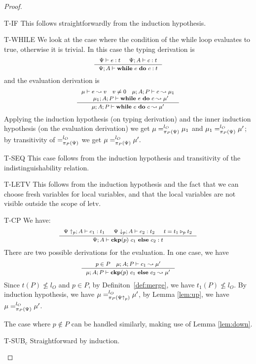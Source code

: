 {{{\begin{proof}
\begin{ProofEnumDesc}
\item[T-IF]
This follows straightforwardly from the induction hypothesis.

\item[T-WHILE]
We look at the case where the condition of the while loop
evaluates to true, otherwise it is trivial.
In this case the typing derivation is
$$\myeqsize
\inference
{\Psi \vdash e : t & \Psi ; A\vdash c : t  }
{\Psi; A \vdash \lcWHILE{e}{c} : t }
$$
and the evaluation derivation is
$$\myeqsize
\inference{
\mu \vdash e \leadsto v\quad v\neq 0\quad
\mu;A; P \vdash c \leadsto \mu_1\\
\quad \mu_1 ; A ; P \vdash \lcWHILE{e}{c} \leadsto \mu'
}
{\mu;A; P \vdash \lcWHILE{e}{c} \leadsto \mu'}
$$
Applying the induction hypothesis (on typing derivation)
and the inner induction hypothesis (on the evaluation derivation)
we get $\mu =^{l_O}_{\app{\Psi}{P}} \mu_1$ and $\mu_1 =^{l_O}_{\app{\Psi}{P}} \mu'$; by transitivity of $=^{l_O}_{\app{\Psi}{P}}$ we get $\mu =^{l_O}_{\app{\Psi}{P}} \mu'.$

\item[T-SEQ] This case follows from the induction hypothesis
and transitivity of the indistinguishability relation.

\item[T-LETV] This follows from the induction hypothesis
and the fact that we can choose fresh variables for local
variables, and that the local variables are not visible
outside the scope of letv.

\item[T-CP]
We have:
$$\myeqsize
\inference
{\Psi\uparrow_{p} ; A \vdash c_1 : t_1 &
\Psi\downarrow_{p} ; A\vdash c_2 : t_2 &
t = \omerge{p}{t_1}{t_2}}
{\Psi; A\vdash \lcCP{p}{c_1}{c_2} : t}
$$
There are two possible derivations for the evaluation.
In one case, we have
$$\myeqsize
\inference{p\in P \quad \mu; A; P \vdash c_1 \leadsto \mu'}
{\mu; A ; P \vdash \lcCP{p}{c_1}{c_2} \leadsto \mu'}
$$
Since $t(P) \nleq l_{O}$ and $p \in P$, by Definiton~\ref{def:merge},
we have $t_1(P) \nleq l_{O}$.
By induction hypothesis, we have $\mu =_{\app{\Psi\uparrow_{p}}{P}}^{l_{O}} \mu'$,
by Lemma \ref{lem:up}, we have $\mu =_{\app{\Psi}{P}}^{l_{O}} \mu'$.

The case where $p \notin P$ can be handled similarly,
making use of Lemma \ref{lem:down}.

\item[T-SUB$_c$] Straightforward by induction.
\end{ProofEnumDesc}
\end{proof}

}}}
